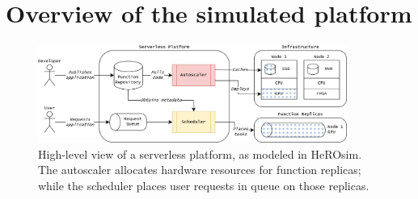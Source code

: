 


\section{Overview of the simulated platform}
\label{section:herosim-overview}


\begin{figure}[t]
    \centering
    \includegraphics[width=0.9\textwidth]{7_Chapitre5/figures/platform.png}
    \caption{High-level view of a serverless platform, as modeled in HeROsim. The autoscaler allocates hardware resources for function replicas; while the scheduler places user requests in queue on those replicas.}
\label{figure:herosim-platform}
\end{figure}





